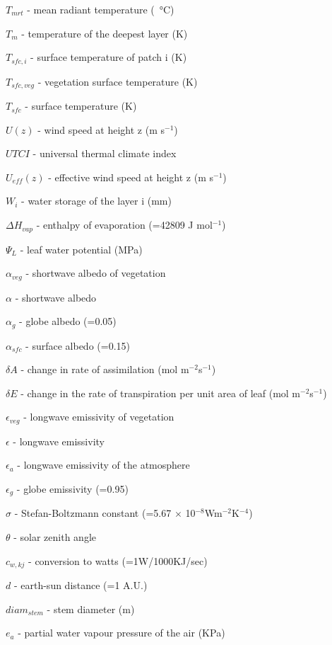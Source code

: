 {\begin{description}
\item $T_{mrt}$  -  mean radiant temperature (\SI{}{\degreeCelsius})  
\item $T_{m}$  -    temperature of the deepest layer (K) 
\item $T_{sfc,i}$  -  surface temperature of patch i (K) 
\item $T_{sfc,veg}$  -   vegetation surface temperature (K) 
\item $T_{sfc}$  -  surface temperature (K) 
\item $U(z)$  -   wind speed at height z (m s$^{-1}$)  
\item $UTCI$   -    universal thermal climate index
\item $U_{eff}(z)$  -  effective wind speed at height z (m s$^{-1}$) 
\item $W_{i}$  -  water storage of the layer i (mm) 
\item $\Delta H_{vap}$  -  enthalpy of evaporation (=42809 J mol$^{-1}$) 
\item $\Psi_{L}$  -  leaf water potential (MPa) 
\item $\alpha _{veg}$  -     shortwave albedo of vegetation
\item $\alpha$  -  shortwave albedo 
\item $\alpha_{g}$  -  globe albedo (=0.05) 
\item $\alpha_{sfc}$  -  surface albedo (=0.15) 
\item $\delta{A}$  -  change in rate of assimilation (mol m$^{-2}$s$^{-1}$) 
\item $\delta{E}$  -  change in the rate of transpiration per unit area of leaf (mol m$^{-2}$s$^{-1}$)
\item $\epsilon _{veg}$  -   longwave emissivity of vegetation
\item $\epsilon$  -   longwave emissivity
\item $\epsilon_{a}$  -  longwave emissivity of the atmosphere 
\item $\epsilon_{g}$  -  globe emissivity (=0.95)  
\item $\sigma$  -   Stefan-Boltzmann constant (=5.67 $\times$ 10$^{-8}$Wm$^{-2}$K$^{-4}$) 
\item $\theta$  -   solar zenith angle 
\item $c_{w,kj}$  -  conversion to watts (=1W/1000KJ/sec) 
\item $d$  -  earth-sun distance (=1 A.U.) 
\item $diam _{stem}$  -  stem diameter (m) 
\item $e_{a}$  -  partial water vapour pressure of the air (KPa) 

\end{description}}
